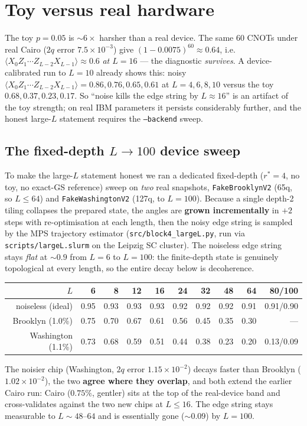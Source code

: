 \documentclass[11pt]{article}
\newcommand{\Oedge}{X_0 Z_1\cdots Z_{L-2} X_{L-1}}
\newcommand{\expv}[1]{\langle #1\rangle}
\newcommand{\code}[1]{\texttt{#1}}
\begin{document}
\section{Toy versus real hardware}
The toy $p=0.05$ is ${\sim}6\times$ harsher than a real device. The same
$60$ CNOTs under real Cairo ($2q$ error $7.5\times10^{-3}$) give
$(1-0.0075)^{60}\approx0.64$, i.e.\ $\expv{\Oedge}\approx0.6$ \emph{at $L=16$} ---
the diagnostic \emph{survives}. A device-calibrated run to $L=10$ already shows
this: noisy $\expv{\Oedge}=0.86,0.76,0.65,0.61$ at $L=4,6,8,10$ versus the toy
$0.68,0.37,0.23,0.17$. So ``noise kills the edge string by $L\approx16$'' is an
artifact of the toy strength; on real IBM parameters it persists considerably
further, and the honest large-$L$ statement requires the \code{--backend} sweep.

\subsection{The fixed-depth $L\to100$ device sweep}\label{sec:largeL}
To make the large-$L$ statement honest we ran a dedicated fixed-depth
($r^\ast=4$, no toy, no exact-GS reference) sweep on \emph{two} real snapshots,
\code{FakeBrooklynV2} (65q, so $L\le64$) and \code{FakeWashingtonV2} (127q, to
$L=100$). Because a single depth-2 tiling collapses the prepared state, the
angles are \textbf{grown incrementally} in $+2$ steps with re-optimisation at
each length, then the noisy edge string is sampled by the MPS trajectory
estimator (\code{src/block4\_largeL.py}, run via \code{scripts/largeL.slurm} on
the Leipzig SC cluster). The noiseless edge string stays \emph{flat} at
${\sim}0.9$ from $L=6$ to $L=100$: the finite-depth state is genuinely
topological at every length, so the entire decay below is decoherence.
\begin{center}
\begin{tabular}{rrrrrrrrrr}
\toprule
$L$ & 6 & 8 & 12 & 16 & 24 & 32 & 48 & 64 & 80/100 \\
\midrule
noiseless (ideal) & 0.95 & 0.93 & 0.93 & 0.93 & 0.92 & 0.92 & 0.92 & 0.91 & 0.91/0.90 \\
Brooklyn (1.0\%)  & 0.75 & 0.70 & 0.67 & 0.61 & 0.56 & 0.45 & 0.35 & 0.30 & --- \\
Washington (1.1\%)& 0.73 & 0.68 & 0.59 & 0.51 & 0.44 & 0.38 & 0.23 & 0.20 & 0.13/0.09 \\
\bottomrule
\end{tabular}
\end{center}
The noisier chip (Washington, $2q$ error $1.15\times10^{-2}$) decays faster than
Brooklyn ($1.02\times10^{-2}$), the two \textbf{agree where they overlap}, and
both extend the earlier Cairo run: Cairo ($0.75\%$, gentler) sits at the top of
the real-device band and cross-validates against the two new chips at $L\le16$.
The edge string stays measurable to $L\sim48$--$64$ and is essentially gone
(${\sim}0.09$) by $L=100$.
\end{document}
